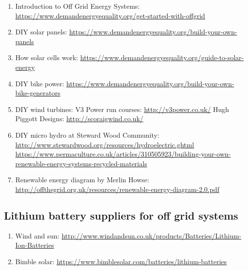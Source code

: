 \documentclass{article}
\theoremstyle{definition}
\theoremstyle{definition}
\theoremstyle{remark}
\begin{document}
    \begin{enumerate}[resume]
      \item Introduction to Off Grid Energy Systems: \newline
        \url{https://www.demandenergyequality.org/get-started-with-offgrid}
      \item DIY solar panels: \newline
        \url{https://www.demandenergyequality.org/build-your-own-panels}
      \item How solar cells work: \newline
        \url{https://www.demandenergyequality.org/guide-to-solar-energy}
      \item DIY bike power: \newline
        \url{https://www.demandenergyequality.org/build-your-own-bike-generators}
      \item DIY wind turbines: \newline
        V3 Power run courses: \url{http://v3power.co.uk/} \newline
        Hugh Piggott Designs: \url{http://scoraigwind.co.uk/}
      \item DIY micro hydro at Steward Wood Community: \newline
        \url{http://www.stewardwood.org/resources/hydroelectric.ghtml} \newline
        \url{https://www.permaculture.co.uk/articles/310505923/building-your-own-renewable-energy-systems-recycled-materials}
      \item Renewable energy diagram by Merlin Howse: \newline
        \url{http://offthegrid.org.uk/resources/renewable-energy-diagram-2.0.pdf}
    \end{enumerate}
  

  \subsection{Lithium battery suppliers for off grid systems} %
  \label{sub:lithium_battery_suppliers_for_off_grid_systems}

    \begin{enumerate}[resume]
      \item Wind and sun: \url{http://www.windandsun.co.uk/products/Batteries/Lithium-Ion-Batteries}
      \item Bimble solar: \url{https://www.bimblesolar.com/batteries/lithium-batteries}
    \end{enumerate}
  

\end{document}

